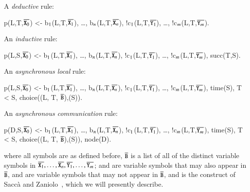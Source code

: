 
A {\em deductive} rule:

\begin{Dedalus}
p(L,T,\(\overline{\dedalus{X}\sb{0}}\)) <- b\(\sb{1}\)(L,T,\(\overline{\dedalus{X}\sb{1}}\)), \ldots, b\(\sb{n}\)(L,T,\(\overline{\dedalus{X}\sb{n}}\)),
!c\(\sb{1}\)(L,T,\(\overline{\dedalus{Y}\sb{1}}\)), \ldots, !c\(\sb{m}\)(L,T,\(\overline{\dedalus{Y}\sb{m}}\)).
\end{Dedalus}

An {\em inductive} rule:

\begin{Dedalus}
p(L,S,\(\overline{\dedalus{X}\sb{0}}\)) <- b\(\sb{1}\)(L,T,\(\overline{\dedalus{X}\sb{1}}\)), \ldots, b\(\sb{n}\)(L,T,\(\overline{\dedalus{X}\sb{n}}\)),
!c\(\sb{1}\)(L,T,\(\overline{\dedalus{Y}\sb{1}}\)), \ldots, !c\(\sb{m}\)(L,T,\(\overline{\dedalus{Y}\sb{m}}\)), succ(T,S).
\end{Dedalus}

An {\em asynchronous local} rule:

\begin{Dedalus}
p(L,S,\(\overline{\dedalus{X}\sb{0}}\)) <- b\(\sb{1}\)(L,T,\(\overline{\dedalus{X}\sb{1}}\)), \ldots, b\(\sb{n}\)(L,T,\(\overline{\dedalus{X}\sb{n}}\)),
!c\(\sb{1}\)(L,T,\(\overline{\dedalus{Y}\sb{1}}\)), \ldots, !c\(\sb{m}\)(L,T,\(\overline{\dedalus{Y}\sb{m}}\)), time(S),
T < S, choice((L, T, \(\overline{\dedalus{B}}\)),(S)).
\end{Dedalus}

An {\em asynchronous communication} rule:

\begin{Dedalus}
p(D,S,\(\overline{\dedalus{X}\sb{0}}\)) <- b\(\sb{1}\)(L,T,\(\overline{\dedalus{X}\sb{1}}\)), \ldots, b\(\sb{n}\)(L,T,\(\overline{\dedalus{X}\sb{n}}\)),
!c\(\sb{1}\)(L,T,\(\overline{\dedalus{Y}\sb{1}}\)), \ldots, !c\(\sb{m}\)(L,T,\(\overline{\dedalus{Y}\sb{m}}\)), time(S),
T < S, choice((L, T, \(\overline{\dedalus{B}}\)),(S)), node(D).
\end{Dedalus}


where all symbols are as defined before, $\overline{\dedalus{B}}$ is a list of all of the distinct variable symbols in $\overline{\dedalus{X}_1}, \ldots, \overline{\dedalus{X}_n}, \overline{\dedalus{Y}_1}, \ldots, \overline{\dedalus{Y}_m}$;  and  are variable symbols that may also appear in $\overline{\dedalus{B}}$,  and  are variable symbols that may not appear in $\overline{\dedalus{B}}$, and  is the construct of Sacc\`{a} and Zaniolo~\cite{sacca-zaniolo}, which we will presently describe.


